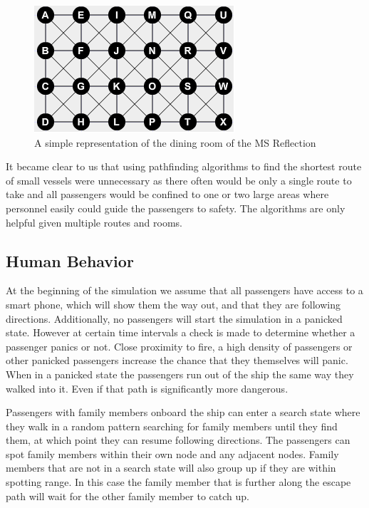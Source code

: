 \begin{figure} [h]
\centering
\includegraphics{images/complex.png}
\caption{A simple representation of the dining room of the MS Reflection}
\label{fig:complex}
\end{figure}

It became clear to us that using pathfinding algorithms to find the shortest route of small vessels were unnecessary as  there often would be only a single route to take and all passengers would be confined to one or two large areas where personnel easily could guide the passengers to safety. The algorithms are only helpful given multiple routes and rooms. 

\subsection{Human Behavior}


At the beginning of the simulation we assume that all passengers have access to a smart phone, which will show them the way out, and that they are following directions. Additionally, no passengers will start the simulation in a panicked state. However at certain time intervals a check is made to determine whether a passenger panics or not. Close proximity to fire, a high density of passengers or other panicked passengers increase the chance that they themselves will panic. When in a panicked state the passengers run out of the ship the same way they walked into it. Even if that path is significantly more dangerous.

Passengers with family members onboard the ship can enter a search state where they walk in a random pattern searching for family members until they find them, at which point they can resume following directions. The passengers can spot family members within their own node and any adjacent nodes. Family members that are not in a search state will also group up if they are within spotting range. In this case the family member that is further along the escape path will wait for the other family member to catch up.

